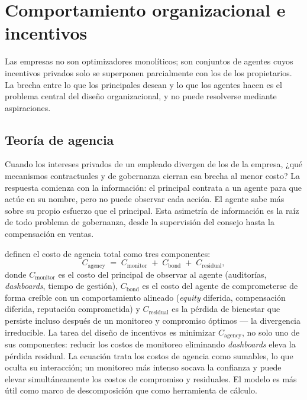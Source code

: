 \chapter{Comportamiento organizacional e incentivos}\label{ch:organizational-behavior}


Las empresas no son optimizadores monolíticos; son conjuntos de agentes cuyos incentivos privados solo se superponen parcialmente con los de los propietarios. La brecha entre lo que los principales desean y lo que los agentes hacen es el problema central del diseño organizacional, y no puede resolverse mediante aspiraciones.

\section{Teoría de agencia}\label{sec:agency-theory}

Cuando los intereses privados de un empleado divergen de los de la empresa, ¿qué mecanismos contractuales y de gobernanza cierran esa brecha al menor costo? La respuesta comienza con la información: el principal contrata a un agente para que actúe en su nombre, pero no puede observar cada acción. El agente sabe más sobre su propio esfuerzo que el principal. Esta asimetría de información es la raíz de todo problema de gobernanza, desde la supervisión del consejo hasta la compensación en ventas.

\textcite{jensen1976agency} definen el costo de agencia total como tres componentes:
\begin{equation}\label{eq:agency-cost}
  C_{\text{agency}} \;=\; C_{\text{monitor}} \;+\; C_{\text{bond}} \;+\; C_{\text{residual}},
\end{equation}
donde \(C_{\text{monitor}}\) es el costo del principal de observar al agente (auditorías, \emph{dashboards}, tiempo de gestión), \(C_{\text{bond}}\) es el costo del agente de comprometerse de forma creíble con un comportamiento alineado (\emph{equity} diferida, compensación diferida, reputación comprometida) y \(C_{\text{residual}}\) es la pérdida de bienestar que persiste incluso después de un monitoreo y compromiso óptimos --- la divergencia irreducible. La tarea del diseño de incentivos es minimizar \(C_{\text{agency}}\), no solo uno de sus componentes: reducir los costos de monitoreo eliminando \emph{dashboards} eleva la pérdida residual. La ecuación trata los costos de agencia como sumables, lo que oculta su interacción; un monitoreo más intenso socava la confianza y puede elevar simultáneamente los costos de compromiso y residuales. El modelo es más útil como marco de descomposición que como herramienta de cálculo.

